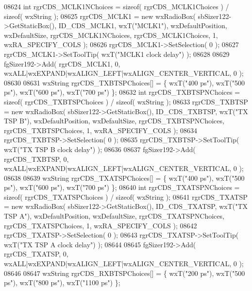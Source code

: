 \begin{DoxyCode}
08624     \textcolor{keywordtype}{int} rgrCDS\_MCLK1NChoices = \textcolor{keyword}{sizeof}( rgrCDS\_MCLK1Choices ) / \textcolor{keyword}{sizeof}( wxString );
08625     rgrCDS_MCLK1 = \textcolor{keyword}{new} wxRadioBox( sbSizer122->GetStaticBox(), ID_CDS_MCLK1, wxT(\textcolor{stringliteral}{"MCLK1"}), 
      wxDefaultPosition, wxDefaultSize, rgrCDS\_MCLK1NChoices, rgrCDS\_MCLK1Choices, 1, wxRA\_SPECIFY\_COLS );
08626     rgrCDS_MCLK1->SetSelection( 0 );
08627     rgrCDS_MCLK1->SetToolTip( wxT(\textcolor{stringliteral}{"MCLK1 clock delay"}) );
08628     
08629     fgSizer192->Add( rgrCDS_MCLK1, 0, wxALL|wxEXPAND|wxALIGN\_LEFT|wxALIGN\_CENTER\_VERTICAL, 0 );
08630     
08631     wxString rgrCDS\_TXBTSPChoices[] = \{ wxT(\textcolor{stringliteral}{"400 ps"}), wxT(\textcolor{stringliteral}{"500 ps"}), wxT(\textcolor{stringliteral}{"600 ps"}), wxT(\textcolor{stringliteral}{"700 ps"}) \};
08632     \textcolor{keywordtype}{int} rgrCDS\_TXBTSPNChoices = \textcolor{keyword}{sizeof}( rgrCDS\_TXBTSPChoices ) / \textcolor{keyword}{sizeof}( wxString );
08633     rgrCDS_TXBTSP = \textcolor{keyword}{new} wxRadioBox( sbSizer122->GetStaticBox(), ID_CDS_TXBTSP, wxT(\textcolor{stringliteral}{"TX TSP B"}), 
      wxDefaultPosition, wxDefaultSize, rgrCDS\_TXBTSPNChoices, rgrCDS\_TXBTSPChoices, 1, wxRA\_SPECIFY\_COLS );
08634     rgrCDS_TXBTSP->SetSelection( 0 );
08635     rgrCDS_TXBTSP->SetToolTip( wxT(\textcolor{stringliteral}{"TX TSP B clock delay"}) );
08636     
08637     fgSizer192->Add( rgrCDS_TXBTSP, 0, wxALL|wxEXPAND|wxALIGN\_LEFT|wxALIGN\_CENTER\_VERTICAL, 0 );
08638     
08639     wxString rgrCDS\_TXATSPChoices[] = \{ wxT(\textcolor{stringliteral}{"400 ps"}), wxT(\textcolor{stringliteral}{"500 ps"}), wxT(\textcolor{stringliteral}{"600 ps"}), wxT(\textcolor{stringliteral}{"700 ps"}) \};
08640     \textcolor{keywordtype}{int} rgrCDS\_TXATSPNChoices = \textcolor{keyword}{sizeof}( rgrCDS\_TXATSPChoices ) / \textcolor{keyword}{sizeof}( wxString );
08641     rgrCDS_TXATSP = \textcolor{keyword}{new} wxRadioBox( sbSizer122->GetStaticBox(), ID_CDS_TXATSP, wxT(\textcolor{stringliteral}{"TX TSP A"}), 
      wxDefaultPosition, wxDefaultSize, rgrCDS\_TXATSPNChoices, rgrCDS\_TXATSPChoices, 1, wxRA\_SPECIFY\_COLS );
08642     rgrCDS_TXATSP->SetSelection( 0 );
08643     rgrCDS_TXATSP->SetToolTip( wxT(\textcolor{stringliteral}{"TX TSP A clock delay"}) );
08644     
08645     fgSizer192->Add( rgrCDS_TXATSP, 0, wxALL|wxEXPAND|wxALIGN\_LEFT|wxALIGN\_CENTER\_VERTICAL, 0 );
08646     
08647     wxString rgrCDS\_RXBTSPChoices[] = \{ wxT(\textcolor{stringliteral}{"200 ps"}), wxT(\textcolor{stringliteral}{"500 ps"}), wxT(\textcolor{stringliteral}{"800 ps"}), wxT(\textcolor{stringliteral}{"1100 ps"}) \};

\end{DoxyCode}
